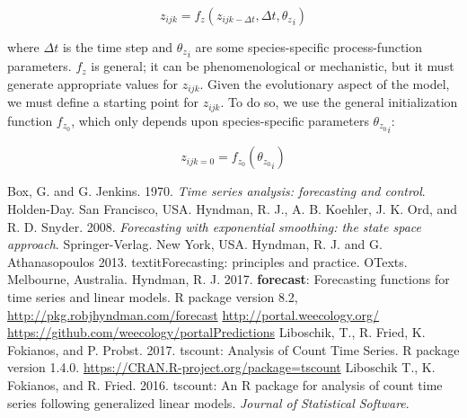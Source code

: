 \documentclass{article}
\begin{document}
\begin{equation}
z_{ijk} = f_z({z_{ijk - \Delta t}}, \Delta t, {{\theta_z}}_i)
\end{equation}

where $\Delta t$ is the time step and ${\theta_{z}}_i$ are some species-specific process-function parameters. $f_z$ is general; it can be phenomenological or mechanistic, but it must generate appropriate values for $z_{ijk}$. Given the evolutionary aspect of the model, we must define a starting point for $z_{ijk}$. To do so, we use the general initialization function $f_{z_0}$, which only depends upon species-specific parameters ${\theta_{z_0}}_i$:

\begin{equation}
z_{ijk = 0} = f_{z_0}({\theta_{z_0}}_i)
\end{equation}



\begin{thebibliography}{9}
Box, G. and G. Jenkins. 1970. \textit{Time series analysis: forecasting and control}. Holden-Day. San Francisco, USA. 
Hyndman, R. J., A. B. Koehler, J. K. Ord, and R. D. Snyder. 2008. \textit{Forecasting with exponential smoothing: the state space approach}. Springer-Verlag. New York, USA.
  Hyndman, R. J. and G. Athanasopoulos 2013. textit{Forecasting: principles and practice}. OTexts. Melbourne, Australia.
  Hyndman, R. J. 2017. \textbf{forecast}: Forecasting functions for time series and linear models. R package version 8.2, \url{http://pkg.robjhyndman.com/forecast}
  \url{http://portal.weecology.org/}
  \url{https://github.com/weecology/portalPredictions}
Liboschik, T., R. Fried, K. Fokianos, and P. Probst. 2017. tscount: Analysis of Count Time Series. R package
  version 1.4.0. \url{https://CRAN.R-project.org/package=tscount}
Liboschik T., K. Fokianos, and R. Fried. 2016. tscount: An R package for analysis of count time series following generalized linear models.
\textit{Journal of Statistical Software}.
\end{thebibliography}
\end{document}
